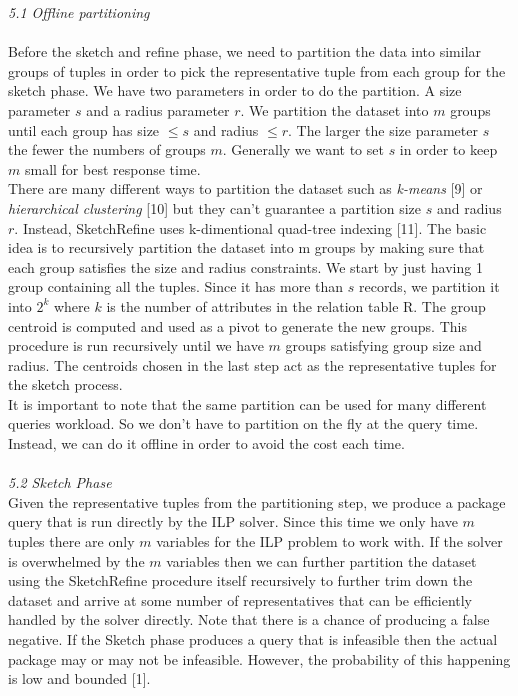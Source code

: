 \documentclass[a4paper,12pt]{article}
\begin{document}
\textit{5.1 Offline partitioning}
\\\\
Before the sketch and refine phase, we need to partition the data into similar groups of tuples in order to pick the representative tuple from each group for the sketch phase. We have two parameters in order to do the partition. A size parameter $s$ and a radius parameter $r$. We partition the dataset into $m$ groups until each group has size $\leq s$ and radius $\leq r$. The larger the size parameter $s$ the fewer the numbers of groups $m$. Generally we want to set $s$ in order to keep $m$ small for best response time. 
\\

There are many different ways to partition the dataset such as \textit{k-means} [9] or \textit{hierarchical clustering} [10] but they can't guarantee a partition size $s$ and radius $r$. Instead, SketchRefine uses k-dimentional quad-tree indexing [11]. The basic idea is to recursively partition the dataset into m groups by making sure that each group satisfies the size and radius constraints. We start by just having 1 group containing all the tuples. Since it has more than $s$ records, we partition it into $2^k$ where $k$ is the number of attributes in the relation table R. The group centroid is computed and used as a pivot to generate the new groups. This procedure is run recursively until we have $m$ groups satisfying group size and radius. The centroids chosen in the last step act as the representative tuples for the sketch process.
\\

It is important to note that the same partition can be used for many different queries workload. So we don't have to partition on the fly at the query time. Instead, we can do it offline in order to avoid the cost each time.  
\\\\
\textit{5.2 Sketch Phase}
\\

Given the representative tuples from the partitioning step, we produce a package query that is run directly by the ILP solver. Since this time we only have $m$ tuples there are only $m$ variables for the ILP problem to work with. If the solver is overwhelmed by the $m$ variables then we can further partition the dataset using the SketchRefine procedure itself recursively to further trim down the dataset and arrive at some number of representatives that can be efficiently handled by the solver directly. Note that there is a chance of producing a false negative. If the Sketch phase produces a query that is infeasible then the actual package may or may not be infeasible. However, the probability of this happening is low and bounded [1].
\\\\
\end{document}
